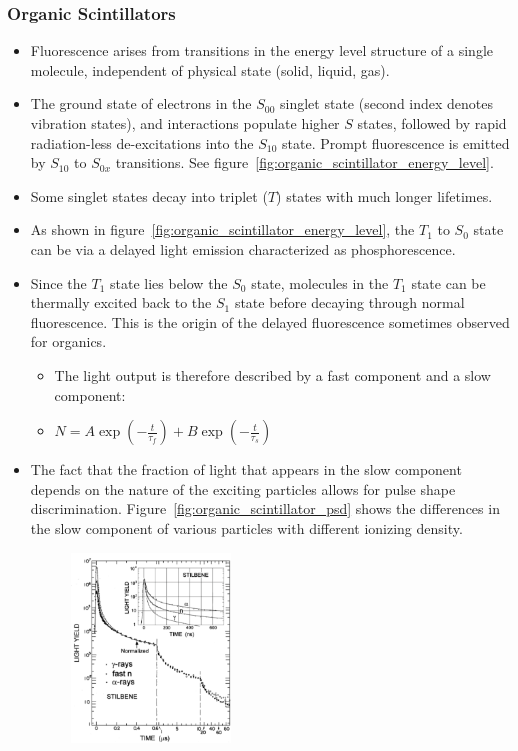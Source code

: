 \subsubsection{Organic Scintillators}
\begin{itemize}
    \item Fluorescence arises from transitions in the energy level structure of a single molecule, independent of physical state (solid, liquid, gas).
    \item The ground state of electrons in the $S_{00}$ singlet state (second index denotes vibration states), and interactions populate higher $S$ states, followed by rapid radiation-less de-excitations into the $S_{10}$ state. Prompt fluorescence is emitted by $S_{10}$ to $S_{0x}$ transitions. See figure~\ref{fig:organic_scintillator_energy_level}.
    \item Some singlet states decay into triplet ($T$) states with much longer lifetimes.
    \item As shown in figure~\ref{fig:organic_scintillator_energy_level}, the $T_1$ to $S_0$ state can be via a delayed light emission characterized as phosphorescence. 
    \item Since the $T_1$ state lies below the $S_0$ state, molecules in the $T_1$ state can be thermally excited back to the $S_1$ state before decaying through normal fluorescence. This is the origin of the delayed fluorescence sometimes observed for organics. 
    \begin{itemize}
        \item The light output is therefore described by a fast component and a slow component:
        \item[] $N=A\exp\left(-\frac{t}{\tau_f}\right)+B\exp\left(-\frac{t}{\tau_s}\right)$
    \end{itemize}
    \item The fact that the fraction of light that appears in the slow component depends on the nature of the exciting particles allows for pulse shape discrimination. Figure~\ref{fig:organic_scintillator_psd} shows the differences in the slow component of various particles with different ionizing density. 
    \begin{figure}[ht]
        \centering
        \includegraphics[width=0.4\textwidth]{images/organic_scintillator_psd.png}

\end{figure}
\end{itemize}
